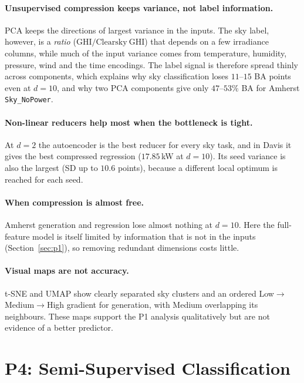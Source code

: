 \documentclass[11pt,letterpaper]{article}
\begin{document}
\paragraph{Unsupervised compression keeps variance, not label information.} PCA keeps the
directions of largest variance in the inputs. The sky label, however, is a \emph{ratio}
($\mathrm{GHI}/\mathrm{Clearsky\ GHI}$) that depends on a few irradiance columns, while much of the
input variance comes from temperature, humidity, pressure, wind and the time encodings. The label
signal is therefore spread thinly across components, which explains why sky classification loses
$11$--$15$ BA points even at $d=10$, and why two PCA components give only $47$--$53\%$ BA for
Amherst \texttt{Sky\_NoPower}.

\paragraph{Non-linear reducers help most when the bottleneck is tight.} At $d=2$ the autoencoder
is the best reducer for every sky task, and in Davis it gives the best compressed regression
($17.85$\,kW at $d=10$). Its seed variance is also the largest (SD up to $10.6$ points), because a
different local optimum is reached for each seed.

\paragraph{When compression is almost free.} Amherst generation and regression lose almost
nothing at $d=10$. Here the full-feature model is itself limited by information that is not in the
inputs (Section~\ref{sec:p1}), so removing redundant dimensions costs little.

\paragraph{Visual maps are not accuracy.} t-SNE and UMAP show clearly separated sky clusters and an
ordered Low$\to$Medium$\to$High gradient for generation, with Medium overlapping its neighbours.
These maps support the P1 analysis qualitatively but are not evidence of a better predictor.
\FloatBarrier

\section{P4: Semi-Supervised Classification}\label{sec:p4}
\end{document}
